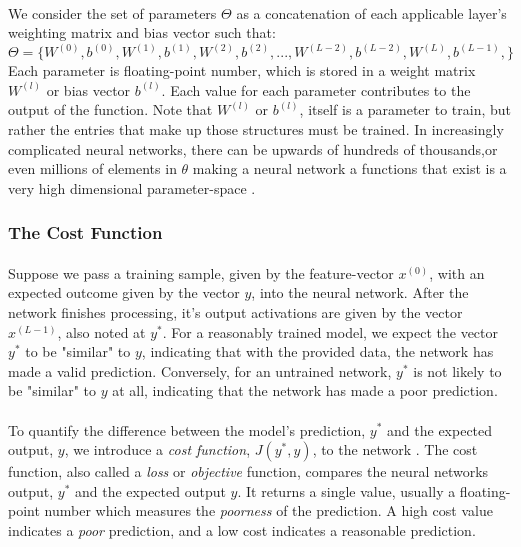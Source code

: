\documentclass[12pt,letterpaper]{article}
\begin{document}
\paragraph*{}We consider the set of parameters $\Theta$ as a concatenation of each applicable layer's weighting matrix and bias vector such that:
\begin{equation}
\label{eqn-Theta}
\Theta = \big\{
W^{(0)}, b^{(0)}, W^{(1)}, b^{(1)}, W^{(2)}, b^{(2)}, ... ,W^{(L-2)}, b^{(L-2)}, W^{(L)}, b^{(L-1)},
\big\}
\end{equation}
Each parameter is floating-point number, which is stored in a weight matrix $W^{(l)}$ or bias vector $b^{(l)}$. Each value for each parameter contributes to the output of the function. Note that $W^{(l)}$ or $b^{(l)}$, itself is a parameter to train, but rather the entries that make up those structures must be trained. In increasingly complicated neural networks, there can be upwards of hundreds of thousands,or even millions of elements in $\theta$ making a neural network a functions that exist is a very high dimensional parameter-space \cite{Geron,Goodfellow}.

\subsubsection{The Cost Function}

\paragraph*{}Suppose we pass a training sample, given by the feature-vector $x^{(0)}$, with an expected outcome given by the vector $y$, into the neural network. After the network finishes processing, it's output activations are given by the vector $x^{(L-1)}$, also noted at $y^*$. For a reasonably trained model, we expect the vector $y^*$ to be "similar" to $y$, indicating that with the provided data, the network has made a valid prediction. Conversely, for an untrained network, $y^*$ is not likely to be "similar" to $y$ at all, indicating that the network has made a poor prediction. 

\paragraph*{}To quantify the difference between the model's prediction, $y^*$ and the expected output, $y$, we introduce a \textit{cost function}, $J(y^*,y)$, to the network \cite{Goodfellow,James}. The cost function, also called a \textit{loss} or \textit{objective} function, compares the neural networks output, $y^*$ and the expected output $y$. It returns a single value, usually a floating-point number which measures the \textit{poorness} of the prediction. A high cost value indicates a \textit{poor} prediction, and a low cost indicates a reasonable prediction. 
\end{document}
